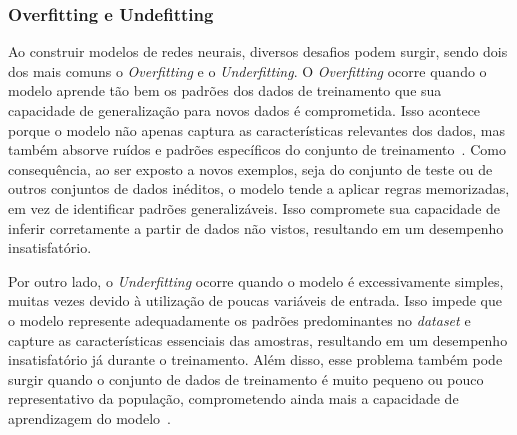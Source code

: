         \subsubsection{Overfitting e Undefitting}
            Ao construir modelos de redes neurais, diversos desafios podem surgir, sendo dois dos mais comuns o 
            \emph{Overfitting} e o \emph{Underfitting}. O \emph{Overfitting} ocorre quando o modelo aprende tão 
            bem os padrões dos dados de treinamento que sua capacidade de generalização para novos dados é 
            comprometida. Isso acontece porque o modelo não apenas captura as características relevantes dos dados, 
            mas também absorve ruídos e padrões específicos do conjunto de treinamento~\cite{montesinos2022}. 
            Como consequência, ao ser exposto a novos exemplos, seja do conjunto de teste ou de outros conjuntos de 
            dados inéditos, o modelo tende a aplicar regras memorizadas, em vez de identificar padrões generalizáveis. 
            Isso compromete sua capacidade de inferir corretamente a partir de dados não vistos, resultando em um 
            desempenho insatisfatório.

            Por outro lado, o \emph{Underfitting} ocorre quando o modelo é excessivamente simples, muitas vezes 
            devido à utilização de poucas variáveis de entrada. Isso impede que o modelo represente adequadamente 
            os padrões predominantes no \emph{dataset} e capture as características essenciais das amostras, 
            resultando em um desempenho insatisfatório já durante o treinamento. Além disso, esse problema também 
            pode surgir quando o conjunto de dados de treinamento é muito pequeno ou pouco representativo da 
            população, comprometendo ainda mais a capacidade de aprendizagem do modelo~\cite{montesinos2022}.
            
        

